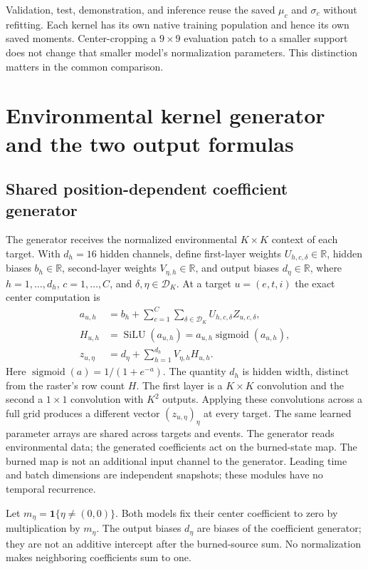 \documentclass[11pt,a4paper]{article}
\newcommand{\R}{\mathbb{R}}
\newcommand{\Ind}{\mathbf{1}}
\begin{document}
Validation, test, demonstration, and inference reuse the saved $\mu_c$ and
$\sigma_c$ without refitting. Each kernel has its own native training
population and hence its own saved moments. Center-cropping a $9\times9$
evaluation patch to a smaller support does not change that smaller model's
normalization parameters. This distinction matters in the common comparison.

\section{Environmental kernel generator and the two output formulas}
\label{sec:probability-models}

\subsection{Shared position-dependent coefficient generator}

The generator receives the normalized environmental $K\times K$ context of
each target. With $d_h=16$ hidden channels, define first-layer weights
$U_{h,c,\delta}\in\R$, hidden biases $b_h\in\R$, second-layer weights
$V_{\eta,h}\in\R$, and output biases $d_\eta\in\R$, where
$h=1,\ldots,d_h$, $c=1,\ldots,C$, and $\delta,\eta\in\mathcal D_K$.
At a target $u=(e,t,i)$ the exact center computation is
\begin{align}
 a_{u,h}&=b_h+\sum_{c=1}^{C}\sum_{\delta\in\mathcal D_K}
                         U_{h,c,\delta}Z_{u,c,\delta},\\
 H_{u,h}&=\operatorname{SiLU}(a_{u,h})
          =a_{u,h}\operatorname{sigmoid}(a_{u,h}),\\
 z_{u,\eta}&=d_\eta+\sum_{h=1}^{d_h}V_{\eta,h}H_{u,h}.
 \label{eq:prob-generator}
\end{align}
Here $\operatorname{sigmoid}(a)=1/(1+e^{-a})$. The quantity $d_h$
is hidden width, distinct from the raster's row count $H$.
The first layer is a $K\times K$ convolution and the second a $1\times1$
convolution with $K^2$ outputs. Applying these convolutions across a full grid
produces a different vector $(z_{u,\eta})_\eta$ at every target. The same
learned parameter arrays are shared across targets and events. The generator
reads environmental data; the generated coefficients act on the burned-state
map. The burned map is not an additional input channel to the generator.
Leading time and batch dimensions are independent snapshots; these modules
have no temporal recurrence.

Let $m_\eta=\Ind\{\eta\neq(0,0)\}$. Both models fix their center coefficient
to zero by multiplication by $m_\eta$. The output biases $d_\eta$ are biases
of the coefficient generator; they are not an additive intercept after the
burned-source sum. No normalization makes neighboring coefficients sum to one.
\end{document}
